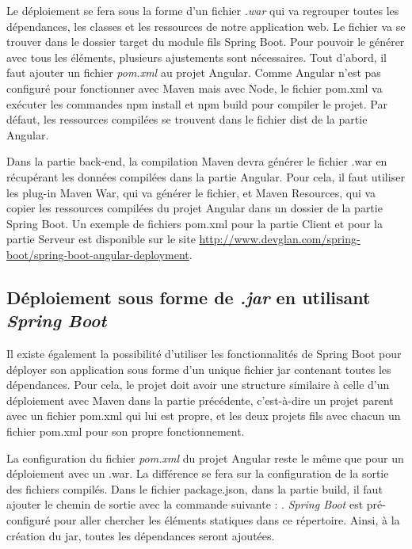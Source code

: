 \documentclass{polytech/polytech}
\begin{document}
Le déploiement se fera sous la forme d’un fichier \textit{.war} qui va regrouper toutes les dépendances, les classes et les ressources de notre application web. Le fichier va se trouver dans le dossier target du module fils Spring Boot. Pour pouvoir le générer avec tous les éléments, plusieurs ajustements sont nécessaires. Tout d’abord, il faut ajouter un fichier \textit{pom.xml} au projet Angular. Comme Angular n’est pas configuré pour fonctionner avec Maven mais avec Node, le fichier pom.xml va exécuter les commandes npm install et npm build pour compiler le projet. Par défaut, les ressources compilées se trouvent dans le fichier dist de la partie Angular. 

Dans la partie back-end, la compilation Maven devra générer le fichier .war en récupérant les données compilées dans la partie Angular. Pour cela, il faut utiliser les plug-in Maven War, qui va générer le fichier, et Maven Resources, qui va copier les ressources compilées du projet Angular dans un dossier de la partie Spring Boot. Un exemple de fichiers pom.xml pour la partie Client et pour la partie Serveur est disponible sur le site \url{http://www.devglan.com/spring-boot/spring-boot-angular-deployment}.


\subsection{Déploiement sous forme de \textit{.jar} en utilisant \textit{Spring Boot}}

Il existe également la possibilité d’utiliser les fonctionnalités de Spring Boot pour déployer son application sous forme d’un unique fichier jar contenant toutes les dépendances. Pour cela, le projet doit avoir une structure similaire à celle d’un déploiement avec Maven dans la partie précédente, c’est-à-dire un projet parent avec un fichier pom.xml qui lui est propre, et les deux projets fils avec chacun un fichier pom.xml pour son propre fonctionnement.

La configuration du fichier \textit{pom.xml} du projet Angular reste le même que pour un déploiement avec un .war. La différence se fera sur la configuration de la sortie des fichiers compilés. Dans le fichier package.json, dans la partie build, il faut ajouter le chemin de sortie avec la commande suivante : . \textit{Spring Boot} est pré-configuré pour aller chercher les éléments statiques dans ce répertoire. Ainsi, à la création du jar, toutes les dépendances seront ajoutées.
\end{document}
